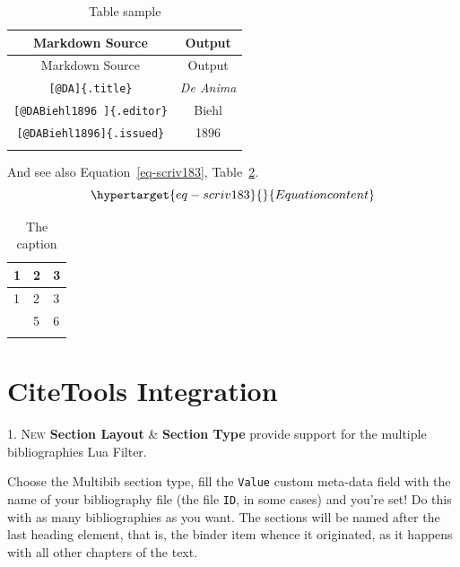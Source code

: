 \documentclass[
  12pt,
  a4paper,
  numbers=noenddot,
  titlepage,
  toclink=all,
  toc=bibliography]{scrbook}
\theoremstyle{plain}
\theoremstyle{definition}
\theoremstyle{definition}
\theoremstyle{definition}
\theoremstyle{plain}
\theoremstyle{plain}
\theoremstyle{plain}
\theoremstyle{plain}
\theoremstyle{remark}
\begin{document}
\hypertarget{tbl-scriv182}{}
\begin{longtable}[]{@{}cc@{}}
\toprule\noalign{}
Markdown Source & Output \\
\midrule\noalign{}
\endfirsthead
\toprule\noalign{}
Markdown Source & Output \\
\midrule\noalign{}
\endhead
\bottomrule\noalign{}
\endlastfoot
\texttt{{[}@DA{]}\{.title\}} & \emph{De Anima} \\
\texttt{{[}@DABiehl1896\ {]}\{.editor\}} & Biehl \\
\texttt{{[}@DABiehl1896{]}\{.issued\}} & 1896 \\
\caption{\label{tbl-scriv182}Table sample}\tabularnewline
\end{longtable}

And see also
\protect\hypertarget{cite_57}{}{\label{cite_57}Equation~\ref{eq-scriv183}},
\protect\hypertarget{cite_58}{}{\label{cite_58}Table~\ref{tbl-scriv184}}.\\
\begin{equation}\protect\hypertarget{eq-scriv183}{}{Equation content
}\label{eq-scriv183}\end{equation}

\hypertarget{tbl-scriv184}{}
\begin{longtable}[]{@{}lll@{}}
\toprule\noalign{}
1 & 2 & 3 \\
\midrule\noalign{}
\endfirsthead
\toprule\noalign{}
1 & 2 & 3 \\
\midrule\noalign{}
\endhead
\bottomrule\noalign{}
\endlastfoot
4 & 5 & 6 \\
\caption{\label{tbl-scriv184}The caption}\tabularnewline
\end{longtable}

\hypertarget{sec-scriv185}{%
\section{CiteTools Integration}\label{sec-scriv185}}

\protect\hypertarget{scriv185}{}{}

\protect\hypertarget{scriv186}{}{} \textsc{1. New} \textbf{Section
Layout} \& \textbf{Section Type} provide support for the multiple
bibliographies Lua Filter.

Choose the Multibib section type, fill the \texttt{Value} custom
meta-data field with the name of your bibliography file (the file
\texttt{ID}, in some cases) and you're set! Do this with as many
bibliographies as you want. The sections will be named after the last
heading element, that is, the binder item whence it originated, as it
happens with all other chapters of the text.
\end{document}
